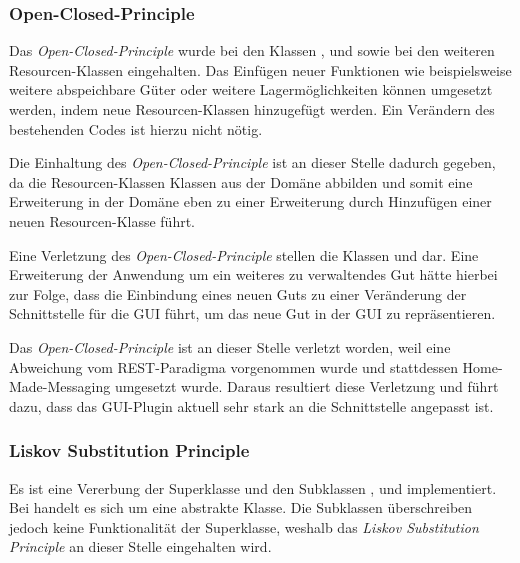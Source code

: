 \subsubsection*{Open-Closed-Principle}
Das \textit{Open-Closed-Principle} wurde bei den Klassen \href{}{}, \href{}{} und \href{}{} sowie bei den weiteren Resourcen-Klassen eingehalten.
Das Einfügen neuer Funktionen wie beispielsweise weitere abspeichbare Güter oder weitere Lagermöglichkeiten können umgesetzt werden, indem neue Resourcen-Klassen hinzugefügt werden.
Ein Verändern des bestehenden Codes ist hierzu nicht nötig.

Die Einhaltung des \textit{Open-Closed-Principle} ist an dieser Stelle dadurch gegeben, da die Resourcen-Klassen Klassen aus der Domäne abbilden und somit eine Erweiterung in der Domäne eben zu einer Erweiterung durch Hinzufügen einer neuen Resourcen-Klasse führt. 

Eine Verletzung des \textit{Open-Closed-Principle} stellen die Klassen \href{}{} und \href{}{} dar.
Eine Erweiterung der Anwendung um ein weiteres zu verwaltendes Gut hätte hierbei zur Folge, dass die Einbindung eines neuen Guts zu einer Veränderung der Schnittstelle für die \ac{GUI} führt, um das neue Gut in der \ac{GUI} zu repräsentieren.

Das \textit{Open-Closed-Principle} ist an dieser Stelle verletzt worden, weil eine Abweichung vom \ac{REST}-Paradigma vorgenommen wurde und stattdessen Home-Made-Messaging umgesetzt wurde.
Daraus resultiert diese Verletzung und führt dazu, dass das \ac{GUI}-Plugin aktuell sehr stark an die Schnittstelle angepasst ist.

\subsubsection*{Liskov Substitution Principle}
Es ist eine Vererbung der Superklasse \href{}{} und den Subklassen \href{}{}, \href{}{} und \href{}{} implementiert.
Bei \href{}{} handelt es sich um eine abstrakte Klasse.
Die Subklassen überschreiben jedoch keine Funktionalität der Superklasse, weshalb das \textit{Liskov Substitution Principle} an dieser Stelle eingehalten wird.

